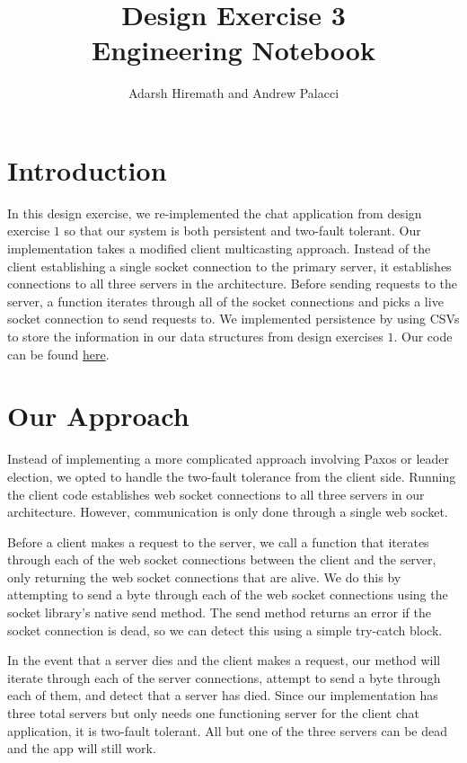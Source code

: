 \documentclass[
	a4paper, %
	10pt, %
	unnumberedsections, %
	twoside, %
]{LTJournalArticle}
\title{Design Exercise 3\\ Engineering Notebook} %
\author{%
	Adarsh Hiremath and Andrew Palacci
}
\begin{document}
\maketitle %


\section{Introduction}
In this design exercise, we re-implemented the chat application from design exercise $1$ so that our system is both persistent and two-fault tolerant. Our implementation takes a modified client multicasting approach. Instead of the client establishing a single socket connection to the primary server, it establishes connections to all three servers in the architecture. Before sending requests to the server, a function iterates through all of the socket connections and picks a live socket connection to send requests to. We implemented persistence by using CSVs to store the information in our data structures from design exercises $1$. Our code can be found \href{https://github.com/andrewp2303/replication}{here}. 

\section{Our Approach}

Instead of implementing a more complicated approach involving Paxos or leader election, we opted to handle the two-fault tolerance from the client side. Running the client code establishes web socket connections to all three servers in our architecture. However, communication is only done through a single web socket. 

Before a client makes a request to the server, we call a function that iterates through each of the web socket connections between the client and the server, only returning the web socket connections that are alive. We do this by attempting to send a byte through each of the web socket connections using the socket library's native send method. The send method returns an error if the socket connection is dead, so we can detect this using a simple try-catch block.

In the event that a server dies and the client makes a request, our method will iterate through each of the server connections, attempt to send a byte through each of them, and detect that a server has died. Since our implementation has three total servers but only needs one functioning server for the client chat application, it is two-fault tolerant. All but one of the three servers can be dead and the app will still work.
\end{document}
